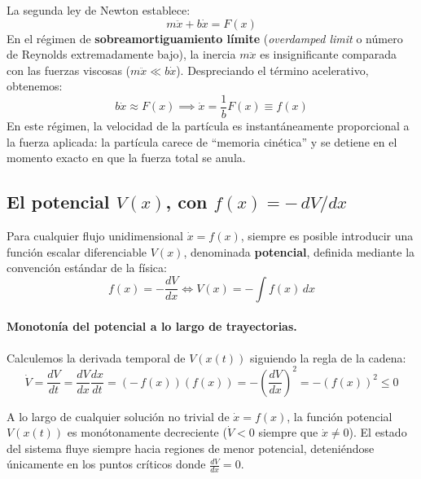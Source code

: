 La segunda ley de Newton establece:
\begin{equation}
    m \ddot{x} + b \dot{x} = F(x)
\end{equation}
En el régimen de \textbf{sobreamortiguamiento límite} (\emph{overdamped limit} o número de Reynolds extremadamente bajo), la inercia $m\ddot{x}$ es insignificante comparada con las fuerzas viscosas ($m\ddot{x} \ll b\dot{x}$). Despreciando el término acelerativo, obtenemos:
\begin{equation}
    b \dot{x} \approx F(x) \implies \dot{x} = \frac{1}{b}F(x) \equiv f(x)
    \label{eq:sobreamortiguado_ode}
\end{equation}
En este régimen, la velocidad de la partícula es instantáneamente proporcional a la fuerza aplicada: la partícula carece de ``memoria cinética'' y se detiene en el momento exacto en que la fuerza total se anula.

\subsection{El potencial $V(x)$, con $f(x) = -\,dV/dx$}

Para cualquier flujo unidimensional $\dot{x} = f(x)$, siempre es posible introducir una función escalar diferenciable $V(x)$, denominada \textbf{potencial}, definida mediante la convención estándar de la física:
\begin{equation}
    f(x) = -\frac{dV}{dx} \iff V(x) = -\int f(x) \, dx
    \label{eq:def_potencial}
\end{equation}

\paragraph{Monotonía del potencial a lo largo de trayectorias.}
Calculemos la derivada temporal de $V(x(t))$ siguiendo la regla de la cadena:
\begin{equation}
    \dot{V} = \frac{dV}{dt} = \frac{dV}{dx} \frac{dx}{dt} = \left(-\,f(x)\right) \left(f(x)\right) = -\left(\frac{dV}{dx}\right)^2 = -\left(f(x)\right)^2 \le 0
    \label{eq:derivada_potencial}
\end{equation}

\begin{theorem}
    A lo largo de cualquier solución no trivial de $\dot{x} = f(x)$, la función potencial $V(x(t))$ es monótonamente decreciente ($\dot{V} < 0$ siempre que $\dot{x} \neq 0$). El estado del sistema fluye siempre hacia regiones de menor potencial, deteniéndose únicamente en los puntos críticos donde $\frac{dV}{dx} = 0$.
\end{theorem}

